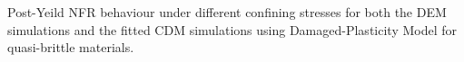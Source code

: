 \label{fig:fitted2} Post-Yeild NFR behaviour under different confining stresses for both the DEM simulations and the fitted CDM simulations using Damaged-Plasticity Model for quasi-brittle materials.